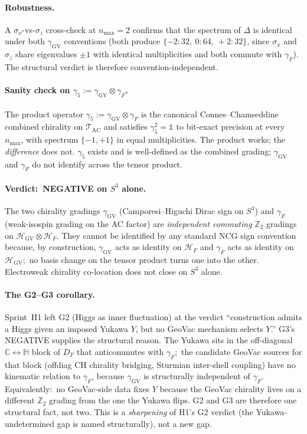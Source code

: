 \documentclass[11pt]{article}
\begin{document}
\paragraph{Robustness.}  A $\sigma_x$-vs-$\sigma_z$ cross-check at
$n_{\max} = 2$ confirms that the spectrum of $\Delta$ is identical
under both $\gamma_{\mathrm{GV}}$ conventions (both produce
$\{-2{:}32,\ 0{:}64,\ +2{:}32\}$, since $\sigma_x$ and $\sigma_z$
share eigenvalues $\pm 1$ with identical multiplicities and both
commute with $\gamma_F$).  The structural verdict is therefore
convention-independent.

\paragraph{Sanity check on $\gamma_5 := \gamma_{\mathrm{GV}} \otimes
\gamma_F$.}  The product operator
$\gamma_5 := \gamma_{\mathrm{GV}} \otimes \gamma_F$ is the canonical
Connes--Chamseddine combined chirality on $\mathcal{T}_{\mathrm{AC}}$
and satisfies $\gamma_5^2 = \mathbb{1}$ to bit-exact precision at
every $n_{\max}$, with spectrum $\{-1, +1\}$ in equal multiplicities.
The product works; the \emph{difference} does not.  $\gamma_5$ exists
and is well-defined as the combined grading; $\gamma_{\mathrm{GV}}$
and $\gamma_F$ do not identify across the tensor product.

\paragraph{Verdict:\ NEGATIVE on $S^3$ alone.}  The two chirality
gradings $\gamma_{\mathrm{GV}}$ (Camporesi--Higuchi Dirac sign on
$S^3$) and $\gamma_F$ (weak-isospin grading on the AC factor) are
\emph{independent commuting} $\mathbb{Z}_2$ gradings on
$\mathcal{H}_{\mathrm{GV}} \otimes \mathcal{H}_F$.  They cannot be
identified by any standard NCG sign convention because, by
construction, $\gamma_{\mathrm{GV}}$ acts as identity on
$\mathcal{H}_F$ and $\gamma_F$ acts as identity on
$\mathcal{H}_{\mathrm{GV}}$;\ no basis change on the tensor product
turns one into the other.  Electroweak chirality co-location does
not close on $S^3$ alone.

\paragraph{The G2--G3 corollary.}  Sprint~H1 left G2 (Higgs as inner
fluctuation) at the verdict ``construction admits a Higgs given an
imposed Yukawa $Y$, but no GeoVac mechanism selects $Y$.''  G3's
NEGATIVE supplies the structural reason.  The Yukawa sits in the
off-diagonal $\mathbb{C} \leftrightarrow \mathbb{H}$ block of $D_F$
that anticommutes with $\gamma_F$;\ the candidate GeoVac sources for
that block (offdiag CH chirality bridging, Sturmian inter-shell
coupling) have no kinematic relation to $\gamma_F$, because
$\gamma_{\mathrm{GV}}$ is structurally independent of $\gamma_F$.
Equivalently:\ no GeoVac-side data fixes $Y$ because the GeoVac
chirality lives on a different $\mathbb{Z}_2$ grading from the one
the Yukawa flips.  G2 and G3 are therefore one structural fact, not
two.  This is a \emph{sharpening} of H1's G2 verdict (the
Yukawa-undetermined gap is named structurally), not a new gap.
\end{document}
